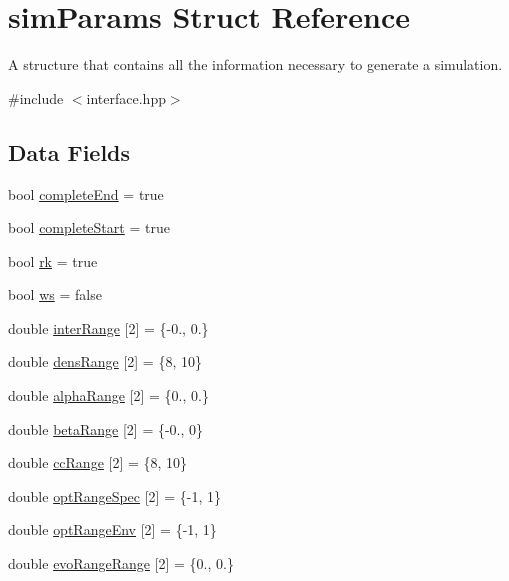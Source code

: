 \hypertarget{structsimParams}{}\section{sim\+Params Struct Reference}
\label{structsimParams}


A structure that contains all the information necessary to generate a simulation.  




{\ttfamily \#include $<$interface.\+hpp$>$}

\subsection*{Data Fields}
\begin{DoxyCompactItemize}
\item 
bool \hyperlink{structsimParams_a7b06eae32b1691cb52bfc4a7e135f589}{complete\+End} = true
\item 
bool \hyperlink{structsimParams_ad96e572c78fc800e13936b937f3addca}{complete\+Start} = true
\item 
bool \hyperlink{structsimParams_ab73f45f2fefc0df819177fac8ecbdb00}{rk} = true
\item 
bool \hyperlink{structsimParams_ab704a8f270ac42b839d92c2c754bf359}{ws} = false
\item 
double \hyperlink{structsimParams_a459d8e2a902ef06f2e6ccce91a5f40bc}{inter\+Range} \mbox{[}2\mbox{]} = \{-\/0., 0.\}
\item 
double \hyperlink{structsimParams_a48b3258fb2eabaf36a4392a3be846366}{dens\+Range} \mbox{[}2\mbox{]} = \{8, 10\}
\item 
double \hyperlink{structsimParams_a2674f228bf6b33bf35dc6d1cfb6befba}{alpha\+Range} \mbox{[}2\mbox{]} = \{0., 0.\}
\item 
double \hyperlink{structsimParams_a676b73cd7d60743090c9f2b4c166c083}{beta\+Range} \mbox{[}2\mbox{]} = \{-\/0., 0\}
\item 
double \hyperlink{structsimParams_a730247ea2898e90b85dd99c55d8a18e3}{cc\+Range} \mbox{[}2\mbox{]} = \{8, 10\}
\item 
double \hyperlink{structsimParams_a169d5e6c66da8b477bb7e384fe4c90b8}{opt\+Range\+Spec} \mbox{[}2\mbox{]} = \{-\/1, 1\}
\item 
double \hyperlink{structsimParams_ab59d469330753aebd7ce7ab893a6eda4}{opt\+Range\+Env} \mbox{[}2\mbox{]} = \{-\/1, 1\}
\item 
double \hyperlink{structsimParams_a328c95295bd7872174fa9a22c9c402cd}{evo\+Range\+Range} \mbox{[}2\mbox{]} = \{0., 0.\}

\end{DoxyCompactItemize}
